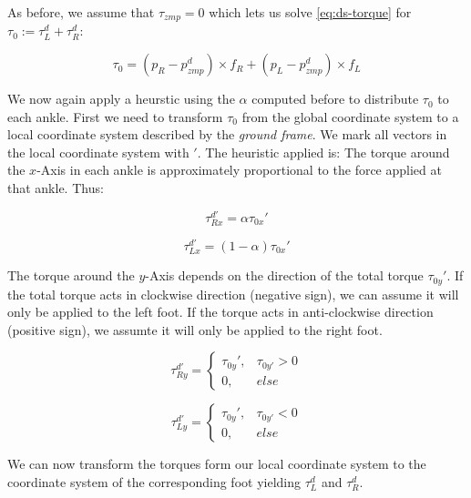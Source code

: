 \documentclass[english,ngerman]{KITreprt}
\begin{document}
As before, we assume that $\tau_{zmp} = 0$ which lets us solve
\ref{eq:ds-torque} for $\tau_0 := \tau^d_L + \tau^d_R$:

\begin{equation} \label{eq:tau0-torque}
\tau_0 = (p_R - p^d_{zmp}) \times f_R + (p_L - p^d_{zmp}) \times f_L
\end{equation}

We now again apply a heurstic using the $\alpha$ computed before to
distribute $\tau_0$ to each ankle. First we need to transform $\tau_0$
from the global coordinate system to a local coordinate system described
by the \emph{ground frame}. We mark all vectors in the local coordinate
system with $'$. The heuristic applied is: The torque around the
$x$-Axis in each ankle is approximately proportional to the force
applied at that ankle. Thus:

\begin{equation} \label{eq:torque-right-x}
\tau^{d'}_{Rx} = \alpha \tau_{0x}'
\end{equation}

\begin{equation} \label{eq:torque-left-x}
\tau^{d'}_{Lx} = (1-\alpha) \tau_{0x}'
\end{equation}

The torque around the $y$-Axis depends on the direction of the total
torque $\tau_{0y}'$. If the total torque acts in clockwise direction
(negative sign), we can assume it will only be applied to the left foot.
If the torque acts in anti-clockwise direction (positive sign), we
assumte it will only be applied to the right foot.

\begin{equation} \label{eq:torque-right-x}
\tau^{d'}_{Ry} = \left\{
\begin{array}{lr}
\tau_{0y}', & \tau_{0y'} > 0 \\
0, & else
\end{array}
\right.
\end{equation}

\begin{equation} \label{eq:torque-left-x}
\tau^{d'}_{Ly} = \left\{
\begin{array}{lr}
\tau_{0y}', & \tau_{0y'} < 0 \\
0, & else
\end{array}
\right.
\end{equation}

We can now transform the torques form our local coordinate system to the
coordinate system of the corresponding foot yielding $\tau^d_L$ and
$\tau^d_R$.
\end{document}
